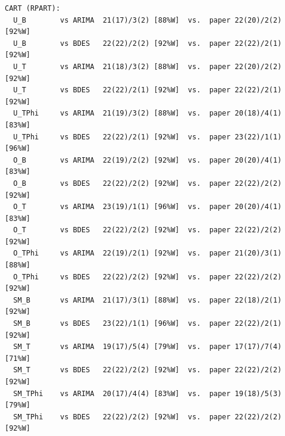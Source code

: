 \begin{verbatim}
CART (RPART):
  U_B        vs ARIMA  21(17)/3(2) [88%W]  vs.  paper 22(20)/2(2) [92%W]
  U_B        vs BDES   22(22)/2(2) [92%W]  vs.  paper 22(22)/2(1) [92%W]
  U_T        vs ARIMA  21(18)/3(2) [88%W]  vs.  paper 22(20)/2(2) [92%W]
  U_T        vs BDES   22(22)/2(1) [92%W]  vs.  paper 22(22)/2(1) [92%W]
  U_TPhi     vs ARIMA  21(19)/3(2) [88%W]  vs.  paper 20(18)/4(1) [83%W]
  U_TPhi     vs BDES   22(22)/2(1) [92%W]  vs.  paper 23(22)/1(1) [96%W]
  O_B        vs ARIMA  22(19)/2(2) [92%W]  vs.  paper 20(20)/4(1) [83%W]
  O_B        vs BDES   22(22)/2(2) [92%W]  vs.  paper 22(22)/2(2) [92%W]
  O_T        vs ARIMA  23(19)/1(1) [96%W]  vs.  paper 20(20)/4(1) [83%W]
  O_T        vs BDES   22(22)/2(2) [92%W]  vs.  paper 22(22)/2(2) [92%W]
  O_TPhi     vs ARIMA  22(19)/2(1) [92%W]  vs.  paper 21(20)/3(1) [88%W]
  O_TPhi     vs BDES   22(22)/2(2) [92%W]  vs.  paper 22(22)/2(2) [92%W]
  SM_B       vs ARIMA  21(17)/3(1) [88%W]  vs.  paper 22(18)/2(1) [92%W]
  SM_B       vs BDES   23(22)/1(1) [96%W]  vs.  paper 22(22)/2(1) [92%W]
  SM_T       vs ARIMA  19(17)/5(4) [79%W]  vs.  paper 17(17)/7(4) [71%W]
  SM_T       vs BDES   22(22)/2(2) [92%W]  vs.  paper 22(22)/2(2) [92%W]
  SM_TPhi    vs ARIMA  20(17)/4(4) [83%W]  vs.  paper 19(18)/5(3) [79%W]
  SM_TPhi    vs BDES   22(22)/2(2) [92%W]  vs.  paper 22(22)/2(2) [92%W]

\end{verbatim}
\endgroup
